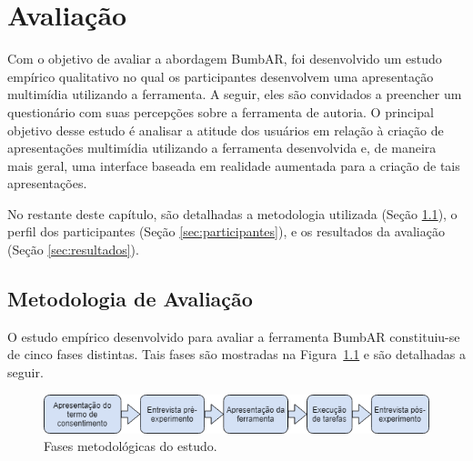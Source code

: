 \documentclass[../main.tex]{subfiles}
\begin{document}
\chapter{Avaliação}\label{cap:avaliacao}

Com o objetivo de avaliar a abordagem BumbAR, foi desenvolvido um estudo empírico qualitativo no qual os participantes desenvolvem uma apresentação multimídia utilizando a ferramenta. A seguir, eles são convidados a preencher um questionário com suas percepções sobre a ferramenta de autoria. O principal objetivo desse estudo é analisar a atitude dos usuários em relação à criação de apresentações multimídia utilizando a ferramenta desenvolvida e, de maneira mais geral, uma interface baseada em realidade aumentada para a criação de tais apresentações.

No restante deste capítulo, são detalhadas a metodologia utilizada (Seção \ref{sec:metodologia}), o perfil dos participantes (Seção \ref{sec:participantes}), e os resultados da avaliação (Seção \ref{sec:resultados}).

\section{Metodologia de Avaliação}
\label{sec:metodologia}

O estudo empírico desenvolvido para avaliar a ferramenta BumbAR constituiu-se de cinco fases distintas. Tais fases são mostradas na Figura~\ref{fig:metodologia_exp} e são detalhadas a seguir.

\begin{figure}[!h]
\centering
\includegraphics[width=0.9\linewidth]{IMG/metodologia_experimento.png}
\caption{Fases metodológicas do estudo.}
\label{fig:metodologia_exp}
\end{figure}
\end{document}
